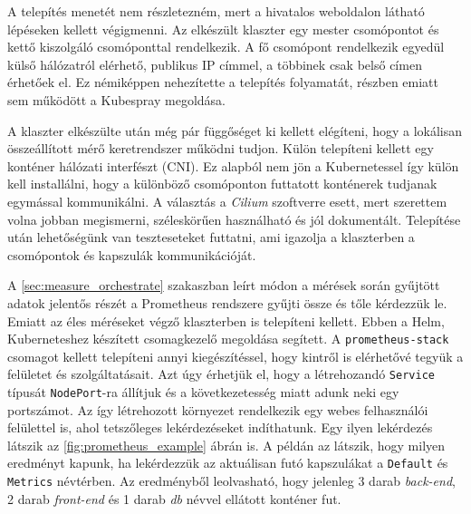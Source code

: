 A telepítés menetét nem részletezném, mert a hivatalos weboldalon látható lépéseken kellett végigmenni. Az elkészült klaszter egy mester csomópontot és kettő kiszolgáló csomóponttal rendelkezik. A fő csomópont rendelkezik egyedül külső hálózatról elérhető, publikus IP címmel, a többinek csak belső címen érhetőek el. Ez némiképpen nehezítette a telepítés folyamatát, részben emiatt sem működött a Kubespray megoldása. 

A klaszter elkészülte után még pár függőséget ki kellett elégíteni, hogy a lokálisan összeállított mérő keretrendszer működni tudjon. Külön telepíteni kellett egy konténer hálózati interfészt (CNI). Ez alapból nem jön a Kubernetessel így külön kell installálni, hogy a különböző csomóponton futtatott konténerek tudjanak egymással kommunikálni. A választás a \textit{Cilium} szoftverre esett, mert szerettem volna jobban megismerni, széleskörűen használható és jól dokumentált. Telepítése után lehetőségünk van teszteseteket futtatni, ami igazolja a klaszterben a csomópontok és kapszulák kommunikációját. 

A \ref{sec:measure_orchestrate} szakaszban leírt módon a mérések során gyűjtött adatok jelentős részét a Prometheus rendszere gyűjti össze és tőle kérdezzük le. Emiatt az éles méréseket végző klaszterben is telepíteni kellett. Ebben a Helm, Kuberneteshez készített csomagkezelő megoldása segített. A \verb+prometheus-stack+ csomagot kellett telepíteni annyi kiegészítéssel, hogy kintről is elérhetővé tegyük a felületet és szolgáltatásait. Azt úgy érhetjük el, hogy a létrehozandó \verb+Service+  típusát \verb+NodePort+-ra állítjuk és a következetesség miatt adunk neki egy portszámot. Az így létrehozott környezet rendelkezik egy webes felhasználói felülettel is, ahol tetszőleges lekérdezéseket indíthatunk. Egy ilyen lekérdezés látszik az \ref{fig:prometheus_example} ábrán is. A példán az látszik, hogy milyen eredményt kapunk, ha lekérdezzük az aktuálisan futó kapszulákat a \verb+Default+ és \verb+Metrics+ névtérben. Az eredményből leolvasható, hogy jelenleg 3 darab \textit{back-end}, 2 darab \textit{front-end} és 1 darab \textit{db} névvel ellátott konténer fut. \\

